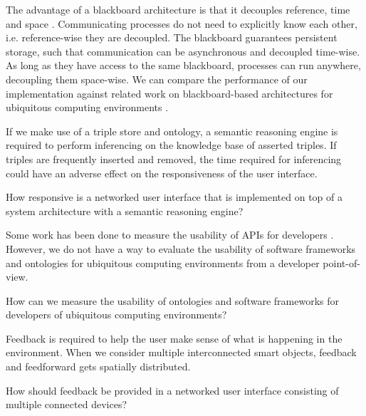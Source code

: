 The advantage of a blackboard architecture is that it decouples reference, time and space \cite{Fensel2004}. Communicating processes do not need to explicitly know each other, i.e. reference-wise they are decoupled. The blackboard guarantees persistent storage, such that communication can be asynchronous and decoupled time-wise. As long as they have access to the same blackboard, processes can run anywhere, decoupling them space-wise. We can compare the performance of our implementation against related work on blackboard-based architectures for ubiquitous computing environments \cite{Winograd2005,Etelapera2011}. 


If we make use of a triple store and ontology, a semantic reasoning engine is required to perform inferencing on the knowledge base of asserted triples. If triples are frequently inserted and removed, the time required for inferencing could have an adverse effect on the responsiveness of the user interface.  

\begin{question}
How responsive is a networked user interface that is implemented on top of a system architecture with a semantic reasoning engine? 
\end{question}


Some work has been done to measure the usability of \acp{API} for developers \cite{Robillard2009}. However, we do not have a way to evaluate the usability of software frameworks and ontologies for ubiquitous computing environments from a developer point-of-view. 

\begin{question}
How can we measure the usability of ontologies and software frameworks for developers of ubiquitous computing environments? 
\end{question}

Feedback is required to help the user make sense of what is happening in the environment. When we consider multiple interconnected smart objects, feedback and feedforward gets spatially distributed. 

\begin{question}
How should feedback be provided in a networked user interface consisting of multiple connected devices? 
\end{question}

